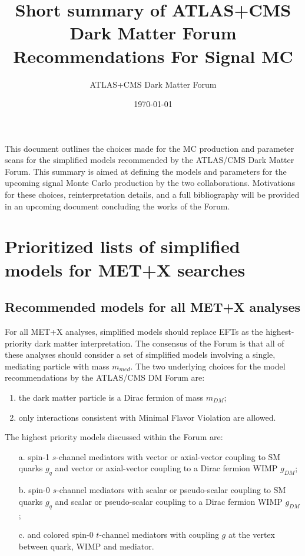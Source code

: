 \documentclass[a4,debug,notitlepage,nobib]{tufte-handout}
\title{Short summary of ATLAS+CMS Dark Matter Forum Recommendations For Signal MC}
\author{ATLAS+CMS Dark Matter Forum}
\date{\today}
\newcommand{\blankpage}{\newpage\hbox{}\thispagestyle{empty}\newpage}
\newcommand{\mdm}{\ensuremath{m_{DM}}\xspace}
\newcommand{\mmed}{\ensuremath{m_{med}}\xspace}
\begin{document}
\setcounter{secnumdepth}{3} %

% 

\maketitle


This document outlines the choices made for the MC production and parameter scans
for the simplified models recommended by the ATLAS/CMS Dark Matter Forum. 
This summary is aimed at defining the models and parameters
for the upcoming signal Monte Carlo production by the two collaborations. 
Motivations for these choices, reinterpretation details, and a full bibliography 
will be provided in an upcoming document concluding the works of the Forum. 

\section{Prioritized lists of simplified models for MET+X searches}

\subsection{Recommended models for all MET+X analyses}
\label{sec:RecommendedModelsAllAnalyses}

For all MET+X analyses, simplified models should replace EFTs as the
highest-priority dark matter interpretation. The consensus of the
Forum is that all of these analyses should consider a set of simplified models involving 
a single, mediating particle with mass \mmed. 
The two underlying choices for the model recommendations by the ATLAS/CMS DM Forum are:
\begin{enumerate}
 \item the dark matter particle is a Dirac fermion of mass \mdm;
 \item only interactions consistent with Minimal Flavor Violation are allowed.
\end{enumerate}

The highest priority models discussed within the Forum are:
\begin{itemize}
\item[a.] spin-1 $s$-channel mediators with vector or 
  axial-vector coupling to SM quarks $g_q$
  and vector or axial-vector coupling to a Dirac fermion WIMP $g_{DM}$;
\item[b.] spin-0 $s$-channel mediators with scalar or 
  pseudo-scalar coupling to SM quarks $g_q$ and scalar or pseudo-scalar
  coupling to a Dirac fermion WIMP $g_{DM}$;
\item[c.] and colored spin-0 $t$-channel mediators with 
  coupling $g$ at the vertex between quark, WIMP 
  and mediator. 
\end{itemize}
\end{document}
